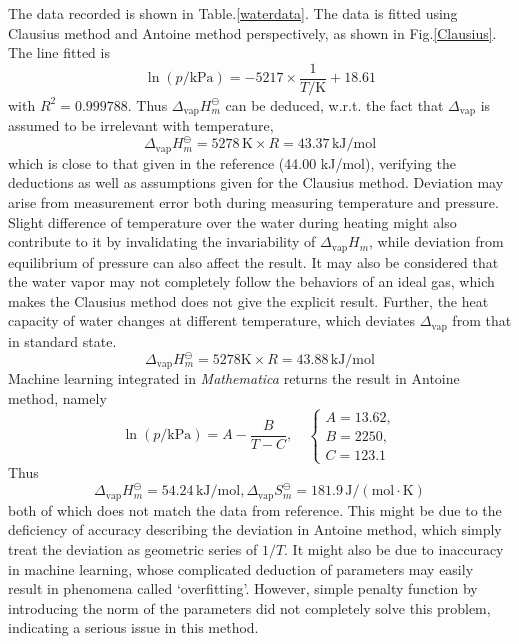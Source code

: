 \documentclass[%
 reprint,
 amsmath,amssymb,
 aps,
10.5pt,
]{revtex4-1}
\newcommand{\unit}[2]{#1 \, \mathrm{#2}}
\begin{document}
The data recorded is shown in Table.\ref{waterdata}. The data is fitted using Clausius method and Antoine method perspectively, as shown in Fig.\ref{Clausius}. The line fitted is
\begin{equation}
\ln{(p/\mathrm{kPa})} = -5217 \times \frac{1}{T/\mathrm{K}} + 18.61
\end{equation}
with $R^2 = 0.999788$. Thus $\Delta_\text{vap} H_m^\ominus$ can be deduced, w.r.t. the fact that $\Delta_\text{vap}$ is assumed to be irrelevant with temperature,
\begin{equation}
\Delta_\text{vap} H_m^\ominus = 5278 \, \mathrm{K} \times R = \unit{43.37}{kJ/mol}
\end{equation}
 which is close to that given in the reference (44.00 kJ/mol\cite{franck1990jd}), verifying the deductions as well as assumptions given for the Clausius method. Deviation may arise from measurement error both during measuring temperature and pressure. Slight difference of temperature over the water during heating might also contribute to it by invalidating the invariability of $\Delta_\text{vap}H_m$, while deviation from equilibrium of pressure can also affect the result. It may also be considered that the water vapor may not completely follow the behaviors of an ideal gas, which makes the Clausius method does not give the explicit result. Further, the heat capacity of water changes at different temperature, which deviates $\Delta_\text{vap}$ from that in standard state.
\begin{equation}
\Delta_\text{vap}H_m^\ominus = 5278 \mathrm{K} \times R = \unit{43.88}{kJ/mol}
\end{equation}
Machine learning integrated in \emph{Mathematica} returns the result in Antoine method, namely
\begin{equation}
\ln{(p/\mathrm{kPa})} = A -\frac{B}{T-C}, \quad
\begin{cases}  
A=13.62,\\B=2250,\\C = 123.1
\end{cases}
\end{equation}
Thus
\begin{equation}
\Delta_\text{vap} H_m ^\ominus = \unit{54.24}{kJ/mol}, \Delta_\text{vap} S_m ^\ominus = \unit{181.9}{J/(mol \cdot K)}
\end{equation}
both of which does not match the data from reference. This might be due to the deficiency of accuracy describing the deviation in Antoine method, which simply treat the deviation as geometric series of $1/T$. It might also be due to inaccuracy in machine learning, whose complicated deduction of parameters may easily result in phenomena called `overfitting'. However, simple penalty function by introducing the norm of the parameters did not completely solve this problem, indicating a serious issue in this method.
\end{document}
